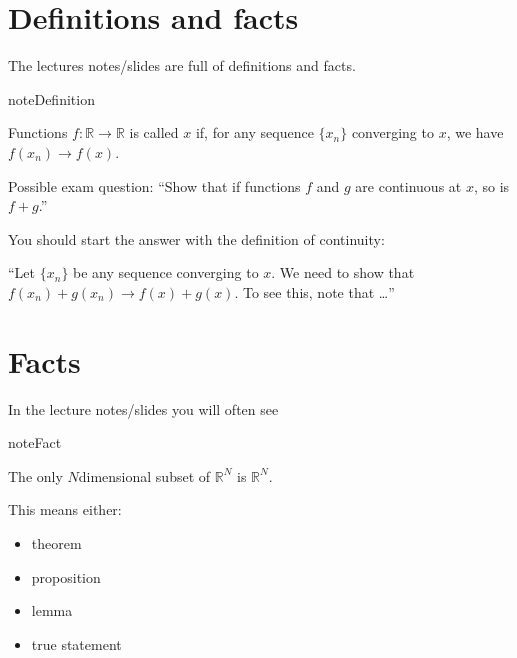 \documentclass[letterpaper,10pt,english]{jupyterBook}
\begin{document}
\section{Definitions and facts}
\label{\detokenize{01.introduction:definitions-and-facts}}
\sphinxAtStartPar
The lectures notes/slides are full of definitions and facts.

\begin{sphinxadmonition}{note}{Definition}

\sphinxAtStartPar
Functions \(f: \mathbb{R} \rightarrow \mathbb{R}\) is called  \(x\) if, for any sequence \(\{x_n\}\) converging to \(x\), we have \(f(x_n) \rightarrow f(x)\).
\end{sphinxadmonition}

\sphinxAtStartPar
Possible exam question: “Show  that if functions \(f\) and \(g\) are continuous at \(x\), so is \(f+g\).”

\sphinxAtStartPar
You should start the answer with the definition of continuity:

\sphinxAtStartPar
“Let \(\{x_n\}\) be any sequence converging to \(x\). We need to show that \(f(x_n) + g(x_n) \rightarrow f(x) + g(x)\). To see this, note that …”


\section{Facts}
\label{\detokenize{01.introduction:facts}}
\sphinxAtStartPar
In the lecture notes/slides you will often see

\begin{sphinxadmonition}{note}{Fact}

\sphinxAtStartPar
The only \(N\)\sphinxhyphen{}dimensional subset of \(\mathbb{R}^N\) is \(\mathbb{R}^N\).
\end{sphinxadmonition}

\sphinxAtStartPar
This means either:
\begin{itemize}
\item {} 
\sphinxAtStartPar
theorem

\item {} 
\sphinxAtStartPar
proposition

\item {} 
\sphinxAtStartPar
lemma

\item {} 
\sphinxAtStartPar
true statement

\end{itemize}
\end{document}
